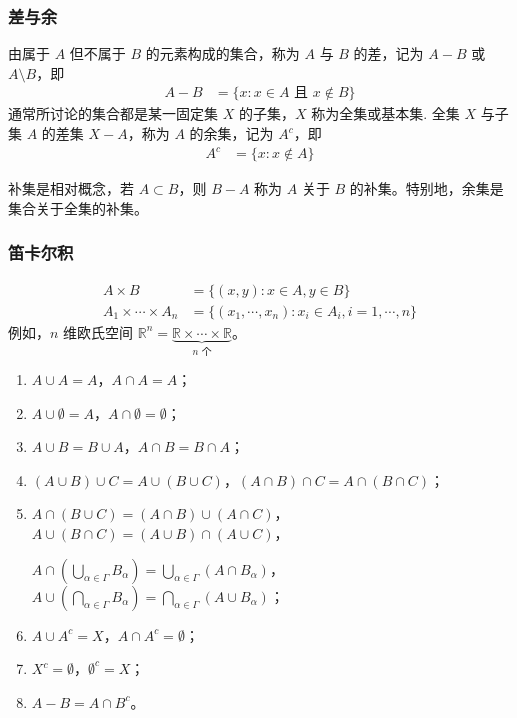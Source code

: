 \documentclass[../../main.tex]{subfiles}
\begin{document}
\subsubsection*{差与余}
由属于 \(A\) 但不属于 \(B\) 的元素构成的集合，称为 \(A\) 与 \(B\) 的差，记为 \(A - B\) 或 \(A \setminus B\)，即
\begin{align*}
A - B &= \{x : x \in A \text{ 且 } x \notin B\}
\end{align*}
通常所讨论的集合都是某一固定集 \(X\) 的子集，\(X\) 称为全集或基本集. 全集 \(X\) 与子集 \(A\) 的差集 \(X - A\)，称为 \(A\) 的余集，记为 \(A^c\)，即
\begin{align*}
A^c &= \{x : x \notin A\}
\end{align*}
\begin{remark}
补集是相对概念，若 \(A \subset B\)，则 \(B - A\) 称为 \(A\) 关于 \(B\) 的补集。特别地，余集是集合关于全集的补集。
\end{remark}

\subsubsection*{笛卡尔积}
\begin{align*}
A \times B &= \{(x, y) : x \in A, y \in B\}\\
A_1 \times \cdots \times A_n &= \{(x_1, \cdots, x_n) : x_i \in A_i, i = 1, \cdots, n\}
\end{align*}
例如，\(n\) 维欧氏空间 \(\mathbb{R}^n = \underbrace{\mathbb{R} \times \cdots \times \mathbb{R}}_{n \text{ 个}}\)。

\begin{theorem}[集合的运算及性质]\label{theorem:集合的运算及性质}
\begin{enumerate}[(1)]
\item \(A \cup A = A\)，\(A \cap A = A\)；

\item \(A \cup \emptyset = A\)，\(A \cap \emptyset = \emptyset\)；

\item \(A \cup B = B \cup A\)，\(A \cap B = B \cap A\)；

\item \((A \cup B) \cup C = A \cup (B \cup C)\)，\((A \cap B) \cap C = A \cap (B \cap C)\)；

\item \(A \cap (B \cup C) = (A \cap B) \cup (A \cap C)\)，\(A \cup (B \cap C) = (A \cup B) \cap (A \cup C)\)，

\(A \cap (\bigcup_{\alpha \in \varGamma} B_{\alpha}) = \bigcup_{\alpha \in \varGamma}(A \cap B_{\alpha})\)，\(A \cup (\bigcap_{\alpha \in \varGamma} B_{\alpha}) = \bigcap_{\alpha \in \varGamma}(A \cup B_{\alpha})\)；

\item \(A \cup A^c = X\)，\(A \cap A^c = \emptyset\)；

\item \(X^c = \emptyset\)，\(\emptyset^c = X\)；

\item \(A - B = A \cap B^c\)。
\end{enumerate}
\end{theorem}
\end{document}
